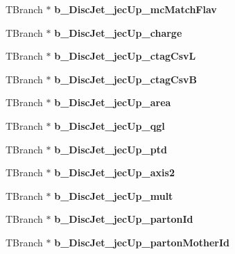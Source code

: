 \begin{DoxyCompactItemize}
\item 
\hypertarget{classMiniTree_a4bfd5d74e2395fd4e0cafa7e7ad38ca1}{}\label{classMiniTree_a4bfd5d74e2395fd4e0cafa7e7ad38ca1} 
T\+Branch $\ast$ {\bfseries b\+\_\+\+Disc\+Jet\+\_\+jec\+Up\+\_\+mc\+Match\+Flav}
\item 
\hypertarget{classMiniTree_a30a4ab8efe93c224bda689de41479e00}{}\label{classMiniTree_a30a4ab8efe93c224bda689de41479e00} 
T\+Branch $\ast$ {\bfseries b\+\_\+\+Disc\+Jet\+\_\+jec\+Up\+\_\+charge}
\item 
\hypertarget{classMiniTree_a9586adbb0566fa5b2b0255b5ef54ba84}{}\label{classMiniTree_a9586adbb0566fa5b2b0255b5ef54ba84} 
T\+Branch $\ast$ {\bfseries b\+\_\+\+Disc\+Jet\+\_\+jec\+Up\+\_\+ctag\+CsvL}
\item 
\hypertarget{classMiniTree_a74d079a08b0062b1ed634ef7c0ad4883}{}\label{classMiniTree_a74d079a08b0062b1ed634ef7c0ad4883} 
T\+Branch $\ast$ {\bfseries b\+\_\+\+Disc\+Jet\+\_\+jec\+Up\+\_\+ctag\+CsvB}
\item 
\hypertarget{classMiniTree_a0ec882ea4401f00fc47acb74f44f56a4}{}\label{classMiniTree_a0ec882ea4401f00fc47acb74f44f56a4} 
T\+Branch $\ast$ {\bfseries b\+\_\+\+Disc\+Jet\+\_\+jec\+Up\+\_\+area}
\item 
\hypertarget{classMiniTree_aee291e3c84516ac1601ea0a6ef7a56be}{}\label{classMiniTree_aee291e3c84516ac1601ea0a6ef7a56be} 
T\+Branch $\ast$ {\bfseries b\+\_\+\+Disc\+Jet\+\_\+jec\+Up\+\_\+qgl}
\item 
\hypertarget{classMiniTree_a6ef8c03f2da6b14ee70fa7eccbd83329}{}\label{classMiniTree_a6ef8c03f2da6b14ee70fa7eccbd83329} 
T\+Branch $\ast$ {\bfseries b\+\_\+\+Disc\+Jet\+\_\+jec\+Up\+\_\+ptd}
\item 
\hypertarget{classMiniTree_a3bdf456df0e54b6a3f7b81b1d8b51076}{}\label{classMiniTree_a3bdf456df0e54b6a3f7b81b1d8b51076} 
T\+Branch $\ast$ {\bfseries b\+\_\+\+Disc\+Jet\+\_\+jec\+Up\+\_\+axis2}
\item 
\hypertarget{classMiniTree_af17c5a176509aa499ee10004f893b908}{}\label{classMiniTree_af17c5a176509aa499ee10004f893b908} 
T\+Branch $\ast$ {\bfseries b\+\_\+\+Disc\+Jet\+\_\+jec\+Up\+\_\+mult}
\item 
\hypertarget{classMiniTree_a477845023358b9339df8a59e9aeba8b9}{}\label{classMiniTree_a477845023358b9339df8a59e9aeba8b9} 
T\+Branch $\ast$ {\bfseries b\+\_\+\+Disc\+Jet\+\_\+jec\+Up\+\_\+parton\+Id}
\item 
\hypertarget{classMiniTree_a9f5e4d972ba9f3af43199a3f8f6ba2be}{}\label{classMiniTree_a9f5e4d972ba9f3af43199a3f8f6ba2be} 
T\+Branch $\ast$ {\bfseries b\+\_\+\+Disc\+Jet\+\_\+jec\+Up\+\_\+parton\+Mother\+Id}

\end{DoxyCompactItemize}

